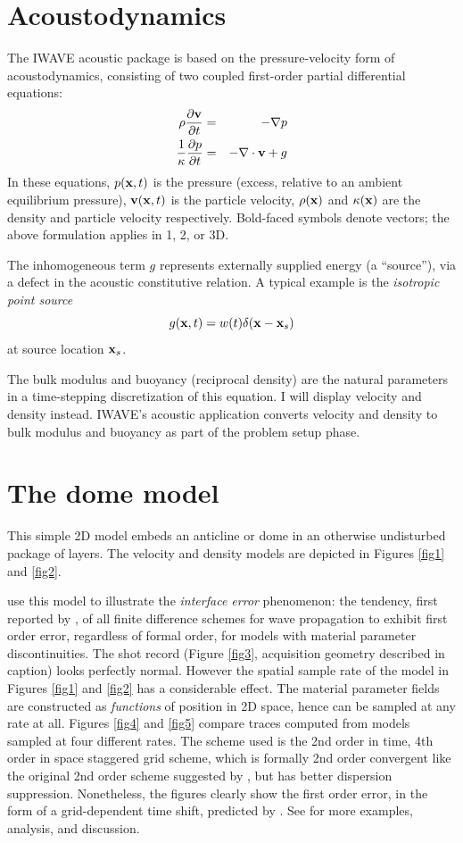 \documentclass [12pt]{georeport}
\newcommand{\bx}{{\bf x}}
\newcommand{\bv}{{\bf v}}
\begin{document}
\section{Acoustodynamics}
The IWAVE acoustic package is based on the pressure-velocity form of acoustodynamics, consisting of two coupled first-order partial differential equations:
\begin{eqnarray}
\label{awe}
\rho \frac{\partial \bv}{\partial t} &=& - \nabla p \\
\frac{1}{\kappa}\frac{\partial p}{\partial t} &=& -\nabla \cdot \bv + g
\end{eqnarray}
In these equations, $p(\bx,t)$ is the pressure (excess, relative to an ambient equilibrium pressure), $\bv(\bx,t)$ is the particle velocity, $\rho(\bx)$ and $\kappa(\bx)$ are the density and particle velocity respectively. Bold-faced symbols denote vectors; the above formulation applies in 1, 2, or 3D. 

The inhomogeneous term $g$ represents externally supplied energy (a
``source''), via a defect in the acoustic constitutive relation. A
typical example is the {\em isotropic point source}
\[
g(\bx,t) = w(t) \delta(\bx-\bx_s)
\]
at source location $\bx_s$.

The bulk modulus and buoyancy (reciprocal density) are the natural parameters in a time-stepping discretization of this equation. I will display velocity and density instead. IWAVE's acoustic application converts velocity and density to bulk modulus and buoyancy as part of the problem setup phase.

\section{The dome model}

This simple 2D model embeds an anticline or dome in an otherwise
undisturbed package of layers. The velocity and density models are
depicted in Figures \ref{fig1} and \ref{fig2}.

\cite{SymesVdovina:09} use this model to illustrate the {\em
  interface error} phenomenon: the tendency, first reported by
\cite{Brown:84}, of all finite difference schemes for wave
propagation to exhibit first order error, regardless of formal order,
for models with material parameter discontinuities. The shot record
(Figure \ref{fig3}, acquisition geometry described in caption) looks
perfectly normal. However the spatial sample rate of the model in
Figures \ref{fig1} and \ref{fig2} has a considerable effect. The
material parameter fields are constructed as {\em functions} of
position in 2D space, hence can be sampled at any rate at all. Figures
\ref{fig4} and \ref{fig5} compare traces computed from models sampled
at four different rates. The scheme used is the 2nd order in time,
4th order in space staggered grid scheme, which is formally 2nd order
convergent like the original 2nd order scheme suggested by
\cite{Vir:84}, but has better dispersion suppression. Nonetheless,
the figures clearly show the first order error, in the form of a
grid-dependent time shift, predicted by \cite{Brown:84}. See
\cite{SymesVdovina:09} for more examples, analysis, and discussion.
\end{document}
